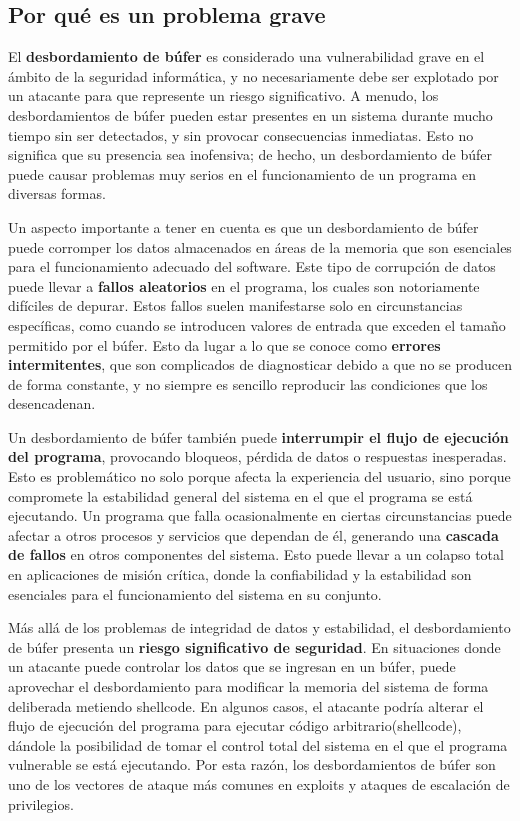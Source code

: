 \newpage
\subsection{Por qué es un problema grave}
\noindent 
El \textbf{desbordamiento de búfer} es considerado una vulnerabilidad grave en el ámbito de la seguridad informática, y no necesariamente debe ser explotado por un atacante para que represente un riesgo significativo. A menudo, los desbordamientos de búfer pueden estar presentes en un sistema durante mucho tiempo sin ser detectados, y sin provocar consecuencias inmediatas. Esto no significa que su presencia sea inofensiva; de hecho, un desbordamiento de búfer puede causar problemas muy serios en el funcionamiento de un programa en diversas formas.

\vspace{0.3cm}
\noindent Un aspecto importante a tener en cuenta es que un desbordamiento de búfer puede corromper los datos almacenados en áreas de la memoria que son esenciales para el funcionamiento adecuado del software. Este tipo de corrupción de datos puede llevar a \textbf{fallos aleatorios} en el programa, los cuales son notoriamente difíciles de depurar. Estos fallos suelen manifestarse solo en circunstancias específicas, como cuando se introducen valores de entrada que exceden el tamaño permitido por el búfer. Esto da lugar a lo que se conoce como \textbf{errores intermitentes}, que son complicados de diagnosticar debido a que no se producen de forma constante, y no siempre es sencillo reproducir las condiciones que los desencadenan.

\vspace{0.3cm}
\noindent Un desbordamiento de búfer también puede \textbf{interrumpir el flujo de ejecución del programa}, provocando bloqueos, pérdida de datos o respuestas inesperadas. Esto es problemático no solo porque afecta la experiencia del usuario, sino porque compromete la estabilidad general del sistema en el que el programa se está ejecutando. Un programa que falla ocasionalmente en ciertas circunstancias puede afectar a otros procesos y servicios que dependan de él, generando una \textbf{cascada de fallos} en otros componentes del sistema. Esto puede llevar a un colapso total en aplicaciones de misión crítica, donde la confiabilidad y la estabilidad son esenciales para el funcionamiento del sistema en su conjunto.

\vspace{0.3cm}
\noindent Más allá de los problemas de integridad de datos y estabilidad, el desbordamiento de búfer presenta un \textbf{riesgo significativo de seguridad}. En situaciones donde un atacante puede controlar los datos que se ingresan en un búfer, puede aprovechar el desbordamiento para modificar la memoria del sistema de forma deliberada metiendo shellcode. En algunos casos, el atacante podría alterar el flujo de ejecución del programa para ejecutar código arbitrario(shellcode), dándole la posibilidad de tomar el control total del sistema en el que el programa vulnerable se está ejecutando. Por esta razón, los desbordamientos de búfer son uno de los vectores de ataque más comunes en exploits y ataques de escalación de privilegios.

\vspace{0.3cm}
